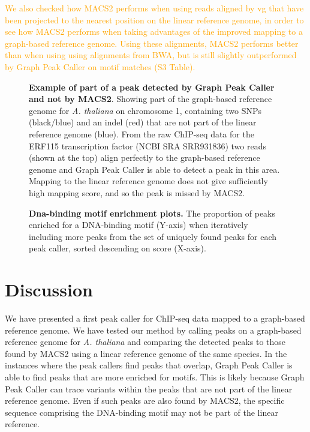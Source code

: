 \documentclass[10pt,letterpaper]{article}
\newcommand{\revision}[1]{\textcolor{orange}{#1}}
\begin{document}
\revision{We also checked how MACS2 performs when using reads aligned by vg that have been projected to the nearest position on the linear reference genome, in order to see how MACS2 performs when taking advantages of the improved mapping to a graph-based reference genome. Using these alignments, MACS2 performs better than when using using alignments from BWA, but is still slightly outperformed by Graph Peak Caller on motif matches (S3 Table).}

\begin{figure}[!h]
 \caption{{\bf Example of part of a peak detected by Graph Peak Caller and not by MACS2}. Showing part of the graph-based reference genome for \emph{A. thaliana} on chromosome 1, containing two SNPs (black/blue) and an indel (red) that are not part of the linear reference genome (blue).
   From the raw ChIP-seq data for the ERF115 transcription factor (NCBI SRA SRR931836) two reads (shown at the top) align perfectly to the graph-based reference genome and Graph Peak Caller is able to detect a peak in this area.
   Mapping to the linear reference genome does not give sufficiently high mapping score, and so the peak is missed by MACS2. }

\label{motif_enrichment_reads}
\end{figure}


\begin{figure}[!h]
 \caption{{\bf Dna-binding motif enrichment plots.} The proportion of peaks enriched for a DNA-binding motif (Y-axis) when iteratively including more peaks from the set of uniquely found peaks for each peak caller, sorted descending on score (X-axis). }
\label{motif_plots}
\end{figure}



\section*{Discussion}
We have presented a first peak caller for ChIP-seq data mapped to a graph-based reference genome. We have tested our method by calling peaks on a graph-based reference genome for \emph{A. thaliana} and comparing the detected peaks to those found by MACS2 using a linear reference genome of the same species. In the instances where the peak callers find peaks that overlap, Graph Peak Caller is able to find peaks that are more enriched for motifs. This is likely because Graph Peak Caller can trace variants within the peaks that are not part of the linear reference genome. Even if such peaks are also found by MACS2, the specific sequence comprising the DNA-binding motif may not be part of the linear reference.
	
\end{document}
